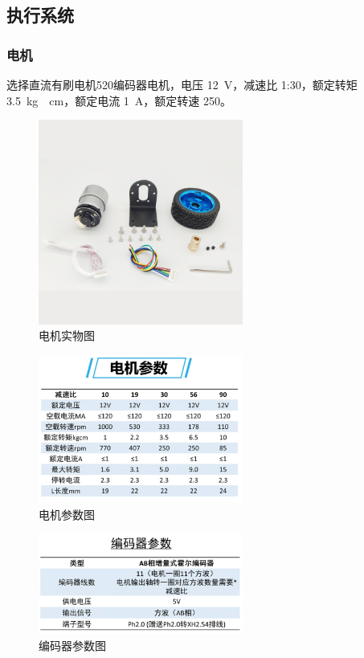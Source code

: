 \documentclass[10pt]{ctexart}
\begin{document}
\subsection{执行系统}

\subsubsection{电机}


选择直流有刷电机520编码器电机，电压 \SI{12}{\volt}，减速比 1:30，额定转矩 \SI{3.5}{\kilogram\cdot\centi\meter}，额定电流 \SI{1}{\ampere}，额定转速 \SI{250}{\rpm}。



\begin{figure}[H]
    \centering
    \includegraphics[width=0.6\textwidth]{motor/motor.png}
    \caption{电机实物图}
    \label{fig:motor}
\end{figure}

\begin{figure}[H]
    \centering
    \includegraphics[width=0.6\textwidth]{motor/motor_parameter1.png}
    \caption{电机参数图}
    \label{fig:motor_parameter1}
\end{figure}

\begin{figure}[H]
    \centering
    \includegraphics[width=0.6\textwidth]{motor/motor_parameter2.png}
    \caption{编码器参数图}
    \label{fig:motor_parameter2}
\end{figure}
\end{document}
